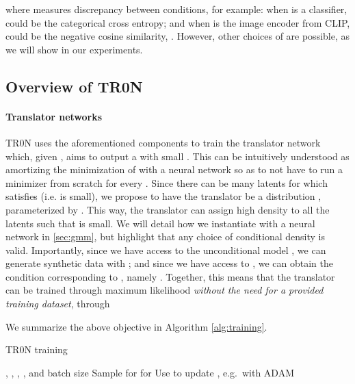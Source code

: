 \documentclass[nohyperref]{article}
\theoremstyle{plain}
\theoremstyle{definition}
\theoremstyle{remark}
\begin{document}
where  measures discrepancy between conditions, for example: when  is a classifier,  could be the categorical cross entropy; and when  is the image encoder from CLIP,  could be the negative cosine similarity, . However, other choices of  are possible, as we will show in our experiments.

\subsection{Overview of TR0N}

\paragraph{Translator networks} TR0N uses the aforementioned components to train the translator network which, given , aims to output a  with small . This can be intuitively understood as amortizing the minimization of  with a neural network so as to not have to run a minimizer from scratch for every . Since there can be many latents  for which  satisfies  (i.e.  is small), we propose to have the translator be a distribution , parameterized by . This way, the translator can assign high density to all the latents  such that  is small. We will detail how we instantiate  with a neural network in \autoref{sec:gmm}, but highlight that any choice of conditional density is valid. Importantly, since we have access to the unconditional model , we can generate synthetic data  with ; and since we have access to , we can obtain the condition corresponding to , namely . Together, this means that the translator can be trained through maximum likelihood \emph{without the need for a provided training dataset}, through

We summarize the above objective in Algorithm \ref{alg:training}.

\begin{algorithm}[t]
   \caption{TR0N training}
   \label{alg:training}
\begin{algorithmic}
    , , , , and batch size 
   \STATE Sample  for 
   \STATE  for 
   \STATE 
   \STATE Use  to update , e.g.\ with ADAM \citep{kingma2015adam}
   \ENDWHILE
\end{algorithmic}
\end{algorithm}
\end{document}
